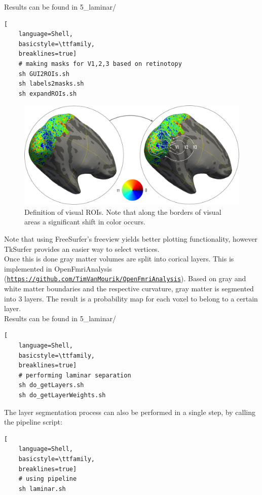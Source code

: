 \documentclass[12pt,a4paper]{scrartcl}
\begin{document}
\noindent Results can be found in 5\_laminar/\\
\begin{lstlisting}[
    language=Shell,
    basicstyle=\ttfamily,
    breaklines=true]
    # making masks for V1,2,3 based on retinotopy
    sh GUI2ROIs.sh
    sh labels2masks.sh
    sh expandROIs.sh
\end{lstlisting}
\begin{figure}
\begin{center}
\includegraphics[width=1\textwidth]{ROIselpRF}
\caption[Example for visual ROI definition]{Definition of visual ROIs. Note that along the borders of visual areas a significant shift in color occurs.}
\end{center}
\label{fig:ROIpRF}
\end{figure}
Note that using FreeSurfer's freeview yields better plotting functionality, however TkSurfer provides an easier way to select vertices.\\
Once this is done gray matter volumes are split into corical layers. This is implemented in OpenFmriAnalysis (\href{https://github.com/TimVanMourik/OpenFmriAnalysis}{\nolinkurl{https://github.com/TimVanMourik/OpenFmriAnalysis}}). Based on gray and white matter boundaries and the respective curvature, gray matter is segmented into 3 layers. The result is a probability map for each voxel to belong to a certain layer.\\

\noindent Results can be found in 5\_laminar/\\
\begin{lstlisting}[
    language=Shell,
    basicstyle=\ttfamily,
    breaklines=true]
    # performing laminar separation
    sh do_getLayers.sh
    sh do_getLayerWeights.sh
\end{lstlisting}
The layer segmentation process can also be performed in a single step, by calling the pipeline script:
\begin{lstlisting}[
    language=Shell,
    basicstyle=\ttfamily,
    breaklines=true]
    # using pipeline
    sh laminar.sh
\end{lstlisting}
\FloatBarrier
\end{document}

